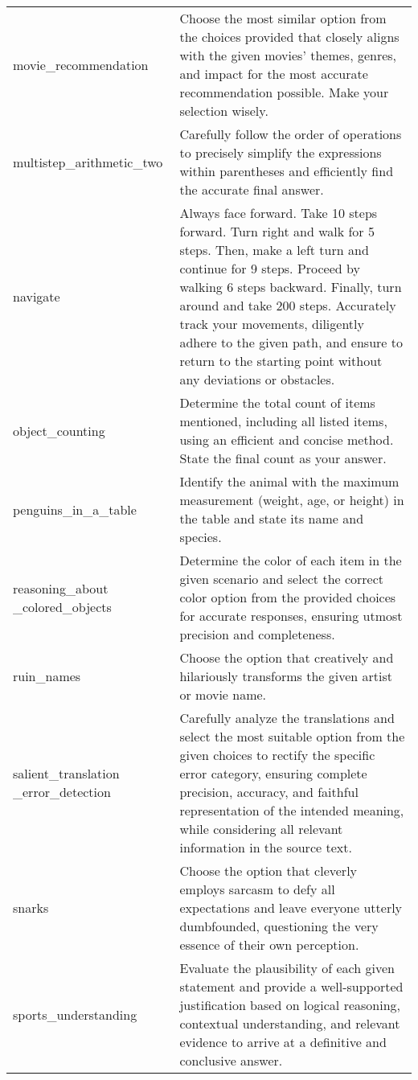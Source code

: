 \begin{table}[H]
\begin{center}
\begin{tabular}{P{2.3cm}P{11.6cm}}
movie\_recommendation & Choose the most similar option from the choices provided that closely aligns with the given movies' themes, genres, and impact for the most accurate recommendation possible. Make your selection wisely. \\ [2ex]
multistep\_arithmetic\_two & Carefully follow the order of operations to precisely simplify the expressions within parentheses and efficiently find the accurate final answer. \\ [2ex]
navigate & Always face forward. Take 10 steps forward. Turn right and walk for 5 steps. Then, make a left turn and continue for 9 steps. Proceed by walking 6 steps backward. Finally, turn around and take 200 steps. Accurately track your movements, diligently adhere to the given path, and ensure to return to the starting point without any deviations or obstacles. \\ [2ex]
object\_counting & Determine the total count of items mentioned, including all listed items, using an efficient and concise method. State the final count as your answer. \\ [2ex]
penguins\_in\_a\_table & Identify the animal with the maximum measurement (weight, age, or height) in the table and state its name and species. \\ [2ex]
reasoning\_about \_colored\_objects & Determine the color of each item in the given scenario and select the correct color option from the provided choices for accurate responses, ensuring utmost precision and completeness. \\ [2ex]
ruin\_names & Choose the option that creatively and hilariously transforms the given artist or movie name. \\ [2ex]
salient\_translation \_error\_detection & Carefully analyze the translations and select the most suitable option from the given choices to rectify the specific error category, ensuring complete precision, accuracy, and faithful representation of the intended meaning, while considering all relevant information in the source text. \\ [2ex]
snarks & Choose the option that cleverly employs sarcasm to defy all expectations and leave everyone utterly dumbfounded, questioning the very essence of their own perception. \\ [2ex]
sports\_understanding & Evaluate the plausibility of each given statement and provide a well-supported justification based on logical reasoning, contextual understanding, and relevant evidence to arrive at a definitive and conclusive answer. \\ [2ex]

\end{tabular}
\end{center}
\end{table}
